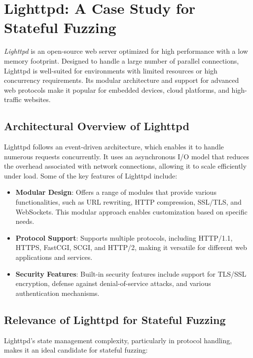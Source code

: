\section{Lighttpd: A Case Study for Stateful Fuzzing}
\textit{Lighttpd} is an open-source web server optimized for high performance with a low memory footprint. Designed to handle a large number of parallel connections, Lighttpd is well-suited for environments with limited resources or high concurrency requirements. Its modular architecture and support for advanced web protocols make it popular for embedded devices, cloud platforms, and high-traffic websites.

\subsection{Architectural Overview of Lighttpd}
Lighttpd follows an event-driven architecture, which enables it to handle numerous requests concurrently. It uses an asynchronous I/O model that reduces the overhead associated with network connections, allowing it to scale efficiently under load. Some of the key features of Lighttpd include:

\begin{itemize}
    \item \textbf{Modular Design}: Offers a range of modules that provide various functionalities, such as URL rewriting, HTTP compression, SSL/TLS, and WebSockets. This modular approach enables customization based on specific needs.
    
    \item \textbf{Protocol Support}: Supports multiple protocols, including HTTP/1.1, HTTPS, FastCGI, SCGI, and HTTP/2, making it versatile for different web applications and services.
    
    \item \textbf{Security Features}: Built-in security features include support for TLS/SSL encryption, defense against denial-of-service attacks, and various authentication mechanisms.
\end{itemize}

\subsection{Relevance of Lighttpd for Stateful Fuzzing}
Lighttpd's state management complexity, particularly in protocol handling, makes it an ideal candidate for stateful fuzzing:

